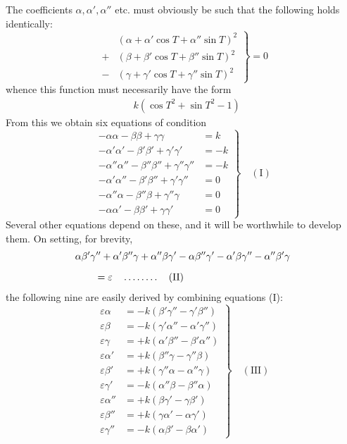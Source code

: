 The coefficients $\alpha,\alpha',\alpha''$ etc. must obviously be such that the following holds identically:
\[
\left.\begin{aligned}
 &(\alpha+\alpha'\cos T+\alpha''\sin T)^2\\[5pt]
+&(\beta+\beta'\cos T+\beta''\sin T)^2\\[5pt]
-&(\gamma+\gamma'\cos T+\gamma''\sin T)^2
\end{aligned}\right\}=0
\]
whence this function must necessarily have the form
\[
\begin{aligned}
&k(\cos T^2+\sin T^2-1)
\end{aligned}
\]
From this we obtain six equations of condition
\[
\left.\begin{aligned}
-\alpha\alpha-\beta\beta+\gamma\gamma&=k\\[5pt]
-\alpha'\alpha'-\beta'\beta'+\gamma'\gamma'&=-k\\[5pt]
-\alpha''\alpha''-\beta''\beta''+\gamma''\gamma''&=-k\\[5pt]
-\alpha'\alpha''-\beta'\beta''+\gamma'\gamma''&=0\\[5pt]
-\alpha''\alpha-\beta''\beta+\gamma''\gamma&=0\\[5pt]
-\alpha\alpha'-\beta\beta'+\gamma\gamma'&=0
\end{aligned}\right\}\quad\mathrm{(I)}
\]
Several other equations depend on these, and it will be worthwhile to develop them. On setting, for brevity,
\[
\begin{aligned}
&\alpha\beta'\gamma''+\alpha'\beta''\gamma+\alpha''\beta\gamma'
-\alpha\beta''\gamma'-\alpha'\beta\gamma''-\alpha''\beta'\gamma
\\[6pt]
&\qquad{}=\varepsilon\quad\mathinner{.\,.\,.\,.\,.\,.\,.\,.}\quad\text{(II)}
\end{aligned}
\]
the following nine are easily derived by combining equations (I):
\[
\left.\begin{aligned}
\varepsilon\alpha&=-k(\beta'\gamma''-\gamma'\beta'')\\[5pt]
\varepsilon\beta&=-k(\gamma'\alpha''-\alpha'\gamma'')\\[5pt]
\varepsilon\gamma&=+k(\alpha'\beta''-\beta'\alpha'')\\[5pt]
\varepsilon\alpha'&=+k(\beta''\gamma-\gamma''\beta)\\[5pt]
\varepsilon\beta'&=+k(\gamma''\alpha-\alpha''\gamma)\\[5pt]
\varepsilon\gamma'&=-k(\alpha''\beta-\beta''\alpha)\\[5pt]
\varepsilon\alpha''&=+k(\beta\gamma'-\gamma\beta')\\[5pt]
\varepsilon\beta''&=+k(\gamma\alpha'-\alpha\gamma')\\[5pt]
\varepsilon\gamma''&=-k(\alpha\beta'-\beta\alpha')
\end{aligned}\right\}\quad\mathrm{(III)}
\]
